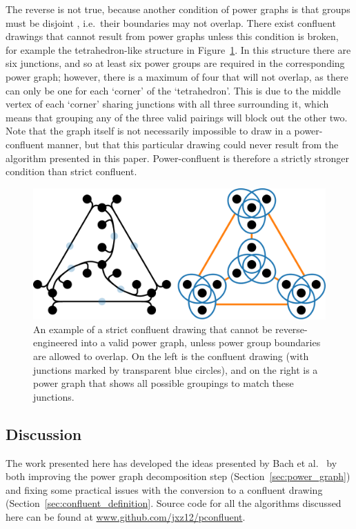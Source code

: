The reverse is not true, because another condition of power graphs is that groups must be disjoint \cite{Royer2008}, i.e.\ their boundaries may not overlap.
There exist confluent drawings that cannot result from power graphs unless this condition is broken, for example the tetrahedron-like structure in Figure~\ref{fig:strict}.
In this structure there are six junctions, and so at least six power groups are required in the corresponding power graph; however, there is a maximum of four that will not overlap, as there can only be one for each `corner' of the `tetrahedron'. This is due to the middle vertex of each `corner' sharing junctions with all three surrounding it, which means that grouping any of the three valid pairings will block out the other two.
Note that the graph itself is not necessarily impossible to draw in a power-confluent manner, but that this particular drawing could never result from the algorithm presented in this paper.
Power-confluent is therefore a strictly stronger condition than strict confluent.

\begin{figure}
  \centering
  \includegraphics[width=\linewidth]{power/stricter.pdf}
  \caption[A strict confluent drawing that is not power-confluent]{An example of a strict confluent drawing that cannot be reverse-engineered into a valid power graph, unless power group boundaries are allowed to overlap. On the left is the confluent drawing (with junctions marked by transparent blue circles), and on the right is a power graph that shows all possible groupings to match these junctions.}
  \label{fig:strict}
\end{figure}

\subsection{Discussion}
\label{sec:power_discussion}
The work presented here has developed the ideas presented by Bach et al.\ \cite{Bach2017} by both improving the power graph decomposition step (Section~\ref{sec:power_graph}) and fixing some practical issues with the conversion to a confluent drawing (Section~\ref{sec:confluent_definition}. Source code for all the algorithms discussed here can be found at \url{www.github.com/jxz12/pconfluent}.

